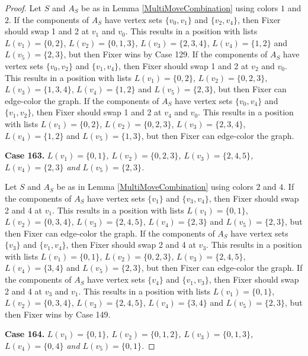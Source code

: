 \documentclass[12pt]{amsart}
\theoremstyle{plain}
\theoremstyle{definition}
\theoremstyle{remark}
\begin{document}
\begin{proof}
Let $S$ and $A_S$ be as in Lemma \ref{MultiMoveCombination} using colors $1$ and $2$. If the components of $A_S$ have vertex sets $\{v_0, v_1\}$ and $\{v_2, v_4\}$, then Fixer should swap 1 and 2 at $v_1$ and $v_0$. This results in a position with lists $L(v_1) = \{0, 2\}$, $L(v_2) = \{0, 1, 3\}$, $L(v_3) = \{2, 3, 4\}$, $L(v_4) = \{1, 2\}$ and $L(v_5) = \{2, 3\}$, but then Fixer wins by Case 129.
If the components of $A_S$ have vertex sets $\{v_0, v_2\}$ and $\{v_1, v_4\}$, then Fixer should swap 1 and 2 at $v_2$ and $v_0$. This results in a position with lists $L(v_1) = \{0, 2\}$, $L(v_2) = \{0, 2, 3\}$, $L(v_3) = \{1, 3, 4\}$, $L(v_4) = \{1, 2\}$ and $L(v_5) = \{2, 3\}$, but then Fixer can edge-color the graph.
If the components of $A_S$ have vertex sets $\{v_0, v_4\}$ and $\{v_1, v_2\}$, then Fixer should swap 1 and 2 at $v_4$ and $v_0$. This results in a position with lists $L(v_1) = \{0, 2\}$, $L(v_2) = \{0, 2, 3\}$, $L(v_3) = \{2, 3, 4\}$, $L(v_4) = \{1, 2\}$ and $L(v_5) = \{1, 3\}$, but then Fixer can edge-color the graph.

\noindent\textbf{Case 163.  }\textit{$L(v_1) = \{0, 1\}$, $L(v_2) = \{0, 2, 3\}$, $L(v_3) = \{2, 4, 5\}$, $L(v_4) = \{2, 3\}$ and $L(v_5) = \{2, 3\}$.}

Let $S$ and $A_S$ be as in Lemma \ref{MultiMoveCombination} using colors $2$ and $4$. If the components of $A_S$ have vertex sets $\{v_1\}$ and $\{v_3, v_4\}$, then Fixer should swap 2 and 4 at $v_1$. This results in a position with lists $L(v_1) = \{0, 1\}$, $L(v_2) = \{0, 3, 4\}$, $L(v_3) = \{2, 4, 5\}$, $L(v_4) = \{2, 3\}$ and $L(v_5) = \{2, 3\}$, but then Fixer can edge-color the graph.
If the components of $A_S$ have vertex sets $\{v_3\}$ and $\{v_1, v_4\}$, then Fixer should swap 2 and 4 at $v_3$. This results in a position with lists $L(v_1) = \{0, 1\}$, $L(v_2) = \{0, 2, 3\}$, $L(v_3) = \{2, 4, 5\}$, $L(v_4) = \{3, 4\}$ and $L(v_5) = \{2, 3\}$, but then Fixer can edge-color the graph.
If the components of $A_S$ have vertex sets $\{v_4\}$ and $\{v_1, v_3\}$, then Fixer should swap 2 and 4 at $v_3$ and $v_1$. This results in a position with lists $L(v_1) = \{0, 1\}$, $L(v_2) = \{0, 3, 4\}$, $L(v_3) = \{2, 4, 5\}$, $L(v_4) = \{3, 4\}$ and $L(v_5) = \{2, 3\}$, but then Fixer wins by Case 149.

\noindent\textbf{Case 164.  }\textit{$L(v_1) = \{0, 1\}$, $L(v_2) = \{0, 1, 2\}$, $L(v_3) = \{0, 1, 3\}$, $L(v_4) = \{0, 4\}$ and $L(v_5) = \{0, 1\}$.}


\end{proof}
\end{document}
